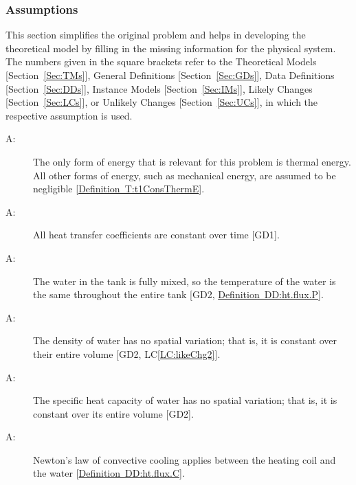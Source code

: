 \documentclass[12pt]{article}
\newcounter{assumpnum}
\newcommand{\atheassumpnum}{A\theassumpnum}
\begin{document}
\subsubsection{Assumptions}
\label{Sec:Assumps}
This section simplifies the original problem and helps in developing the theoretical model by filling in the missing information for the physical system. The numbers given in the square brackets refer to the Theoretical Models {[}Section~\ref{Sec:TMs}{]}, General Definitions {[}Section~\ref{Sec:GDs}{]}, Data Definitions {[}Section~\ref{Sec:DDs}{]}, Instance Models {[}Section~\ref{Sec:IMs}{]}, Likely Changes {[}Section~\ref{Sec:LCs}{]}, or Unlikely Changes {[}Section~\ref{Sec:UCs}{]}, in which the respective assumption is used.
\begin{description}
\item[\atheassumpnum\label{empty}:]The only form of energy that is relevant for this problem is thermal energy. All other forms of energy, such as mechanical energy, are assumed to be negligible {[}\hyperref[T:t1ConsThermE]{Definition~T:t1ConsThermE}{]}.
\end{description}
\begin{description}
\item[\atheassumpnum\label{empty}:]All heat transfer coefficients are constant over time {[}GD1{]}.
\end{description}
\begin{description}
\item[\atheassumpnum\label{empty}:]The water in the tank is fully mixed, so the temperature of the water is the same throughout the entire tank {[}GD2, \hyperref[DD:ht.flux.P]{Definition~DD:ht.flux.P}{]}.
\end{description}
\begin{description}
\item[\atheassumpnum\label{empty}:]The density of water has no spatial variation; that is, it is constant over their entire volume {[}GD2, LC\ref{LC:likeChg2}{]}.
\end{description}
\begin{description}
\item[\atheassumpnum\label{empty}:]The specific heat capacity of water has no spatial variation; that is, it is constant over its entire volume {[}GD2{]}.
\end{description}
\begin{description}
\item[\atheassumpnum\label{empty}:]Newton's law of convective cooling applies between the heating coil and the water {[}\hyperref[DD:ht.flux.C]{Definition~DD:ht.flux.C}{]}.
\end{description}
\end{document}
